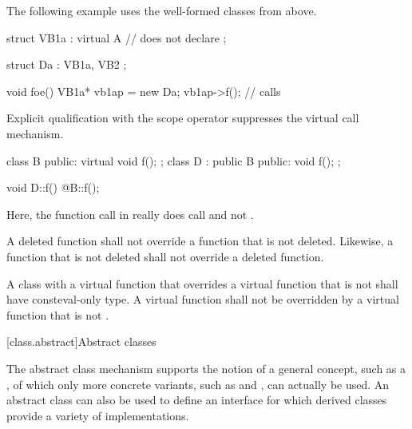 \pnum
\begin{example}
The following example uses the well-formed classes from above.
\begin{codeblock}
struct VB1a : virtual A {       // does not declare 
};

struct Da : VB1a, VB2 {
};

void foe() {
  VB1a*  vb1ap = new Da;
  vb1ap->f();                   // calls 
}
\end{codeblock}
\end{example}

\pnum
{}%
%
Explicit qualification with the scope operator
suppresses the virtual call mechanism.
\begin{example}
\begin{codeblock}
class B { public: virtual void f(); };
class D : public B { public: void f(); };

void D::f() { @\commentellip@ B::f(); }
\end{codeblock}

Here, the function call in
really does call
and not
.
\end{example}

\pnum
A deleted function shall
not override a function that is not deleted. Likewise,
a function that is not deleted shall not override a
deleted function.%

\pnum
A class with a  virtual function that overrides
a virtual function that is not 
shall have consteval-only type.
A  virtual function shall not be overridden by
a virtual function that is not .

[class.abstract]{Abstract classes}%

\pnum
\begin{note}
The abstract class mechanism supports the notion of a general concept,
such as a , of which only more concrete variants, such as
 and , can actually be used. An abstract
class can also be used to define an interface for which derived classes
provide a variety of implementations.
\end{note}

